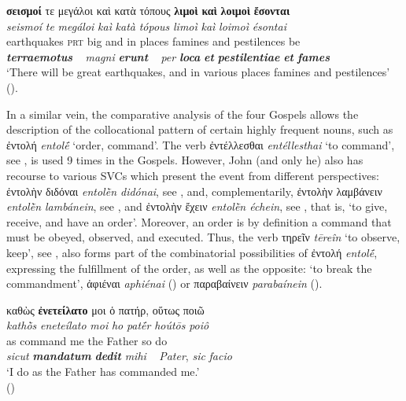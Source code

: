 \documentclass[output=paper,colorlinks,citecolor=brown]{langscibook}
\begin{document}
\ex\label{ex:bj:6d}

\gllll \textbf{σεισμοί} τε μεγάλοι καὶ κατὰ τόπους \textbf{λιμοὶ} \textbf{καὶ} \textbf{λοιμοὶ} \textbf{ἔσονται}\\
 \textit{seismoí} \textit{te} \textit{megáloi} \textit{kaì} \textit{katà} \textit{tópous} \textit{limoì} \textit{kaì} \textit{loimoì} \textit{ésontai}\\
earthquakes \textsc{prt} big and in places famines and pestilences be\\
\textbf{\itshape terraemotus} ~ {\emph{magni} \textbf{\itshape erunt}} ~ \emph{per} \textbf{\itshape loca} {\textbf{\itshape et} \textbf{\itshape pestilentiae}}
\textbf{\itshape et} \textbf{\itshape fames}\\
\glt `There will be great earthquakes, and in various places famines and pestilences' \\
\hspace*{\fill}().

\z

\z

In a similar vein, the comparative analysis of the four Gospels allows the description of
the collocational pattern of certain highly frequent nouns, such as ἐντολή \emph{entolḗ}
`order, command'. The verb ἐντέλλεσθαι \emph{entéllesthai} `to command', see ,
is used 9 times in the Gospels. However, John (and only he) also has recourse to various
SVCs which present the event from different perspectives: ἐντολὴν διδόναι \emph{entolḕn
  didónai}, see , and, complementarily, ἐντολὴν λαμβάνειν \emph{entolḕn
  lambánein}, see , and ἐντολὴν ἔχειν \emph{entolḕn échein}, see ,
that is, `to give, receive, and have an order'. Moreover, an order is by definition a
command that must be obeyed, observed, and executed. Thus, the verb τηρεῖν \emph{tēreîn}
`to observe, keep', see ,  also forms part of the combinatorial possibilities of ἐντολή
\emph{entolḗ}, expressing the fulfillment of the order, as well as the opposite: `to
break the commandment', ἀφιέναι \emph{aphiénai} () or παραβαίνειν
\emph{parabaínein} ().



\ea\label{ex:bj:7}

\ea\label{ex:bj:7a}

\gllll καθὼς \textbf{ἐνετείλατο} μοι ὁ πατήρ, οὕτως ποιῶ\\
 \textit{kathṑs} \textit{eneteílato} \textit{moi} \textit{ho} \textit{patḗr} \textit{hoútōs} \textit{poiô}\\
as command me the Father so do\\
\emph{sicut} {\textbf{\itshape mandatum} \textbf{\itshape dedit}} \emph{mihi} ~ \emph{Pater}, \emph{sic} \emph{facio}\\
\glt `I do as the Father has commanded me.' \\
\hspace*{\fill}()
\end{document}
